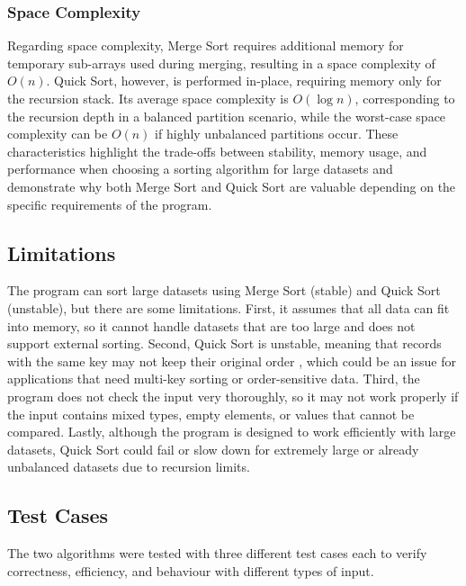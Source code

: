\documentclass[12pt]{article}
\begin{document}
\subsubsection{Space Complexity}

Regarding space complexity, Merge Sort requires additional memory for temporary sub-arrays
used during merging, resulting in a space complexity of $O(n)$\parencite{rizvi2024sorting_algorithms_in_focus}. Quick Sort, however, is performed
in-place, requiring memory only for the recursion stack. Its average space complexity is
$O(\log n)$, corresponding to the recursion depth in a balanced partition scenario, while the
worst-case space complexity can be $O(n)$ if highly unbalanced partitions occur\parencite{rizvi2024sorting_algorithms_in_focus}. These characteristics
highlight the trade-offs between stability, memory usage, and performance when choosing a
sorting algorithm for large datasets and demonstrate why both Merge Sort and Quick Sort are
valuable depending on the specific requirements of the program.

\subsection{Limitations}

The program can sort large datasets using Merge Sort (stable) and Quick Sort (unstable), but
there are some limitations. First, it assumes that all data can fit into memory, so it cannot handle
datasets that are too large and does not support external sorting. Second, Quick Sort is unstable,
meaning that records with the same key may not keep their original order \parencite{rizvi2024sorting_algorithms_in_focus}, which could be an
issue for applications that need multi-key sorting or order-sensitive data. Third, the program does
not check the input very thoroughly, so it may not work properly if the input contains mixed
types, empty elements, or values that cannot be compared. Lastly, although the program is
designed to work efficiently with large datasets, Quick Sort could fail or slow down for
extremely large or already unbalanced datasets due to recursion limits.

\subsection{Test Cases}

The two algorithms were tested with three different test cases each to verify correctness,
efficiency, and behaviour with different types of input.
\end{document}
